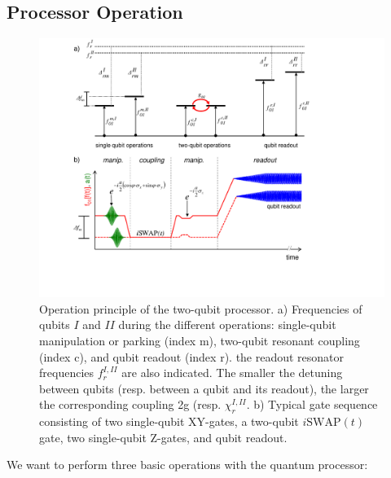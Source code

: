\subsection{Processor Operation}

\begin{figure}[ht!]
	\centering
	\includegraphics[width=\textwidth]{./material/figures/2-qubit-processor/processor_working_principle}
	\caption[...]{Operation principle of the two-qubit processor. a) Frequencies of qubits $I$ and $II$ during the different operations: single-qubit manipulation or parking (index m), two-qubit resonant coupling (index c), and qubit readout (index r). the readout resonator frequencies $f_r^{I,II}$ are also indicated. The smaller the detuning between qubits (resp. between a qubit and its readout), the larger the corresponding coupling 2g  (resp. $\chi_r^{I,II}$. b) Typical gate sequence consisting of two single-qubit XY-gates, a two-qubit $i\mathrm{SWAP}(t)$ gate, two single-qubit Z-gates, and qubit readout.}
	\label{fig:processor_operation}
\end{figure}

We want to perform three basic operations with the quantum processor:

